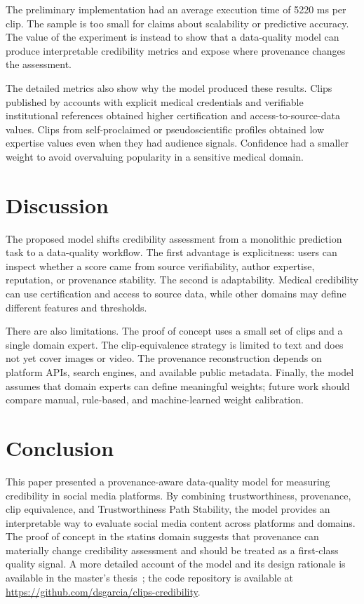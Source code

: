 \documentclass[sigconf, nonacm]{acmart}
\begin{document}
The preliminary implementation had an average execution time of 5220 ms per clip.
The sample is too small for claims about scalability or predictive accuracy. The
value of the experiment is instead to show that a data-quality model can produce
interpretable credibility metrics and expose where provenance changes the
assessment.

The detailed metrics also show why the model produced these results. Clips
published by accounts with explicit medical credentials and verifiable institutional
references obtained higher certification and access-to-source-data values. Clips
from self-proclaimed or pseudoscientific profiles obtained low expertise values
even when they had audience signals. Confidence had a smaller weight to avoid
overvaluing popularity in a sensitive medical domain.

\section{Discussion}

The proposed model shifts credibility assessment from a monolithic prediction
task to a data-quality workflow. The first advantage is explicitness: users can
inspect whether a score came from source verifiability, author expertise,
reputation, or provenance stability. The second is adaptability. Medical
credibility can use certification and access to source data, while other domains
may define different features and thresholds.

There are also limitations. The proof of concept uses a small set of clips and a
single domain expert. The clip-equivalence strategy is limited to text and does not
yet cover images or video. The provenance reconstruction depends on platform APIs,
search engines, and available public metadata. Finally, the model assumes that
domain experts can define meaningful weights; future work should compare manual,
rule-based, and machine-learned weight calibration.

\section{Conclusion}

This paper presented a provenance-aware data-quality model for measuring
credibility in social media platforms. By combining trustworthiness, provenance,
clip equivalence, and Trustworthiness Path Stability, the model provides an
interpretable way to evaluate social media content across platforms and domains.
The proof of concept in the statins domain suggests that provenance can materially
change credibility assessment and should be treated as a first-class quality signal.
A more detailed account of the model and its design rationale is available in
the master's thesis~\cite{GarciaParra2024Thesis}; the code repository is available at
\url{https://github.com/dsgarcia/clips-credibility}.
\end{document}
